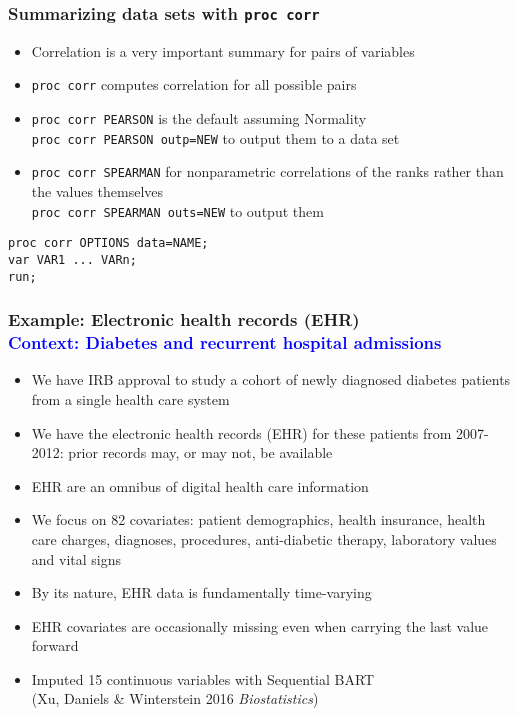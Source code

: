 \documentclass[11pt,pdftex,dvipsnames,usenames,helvetica]{beamer}
\begin{document}
\begin{frame}[fragile]
\frametitle{Summarizing data sets with {\tt proc corr}}
\begin{itemize}
\item Correlation is a very important summary for pairs of variables
\item {\tt proc corr} computes correlation for all possible pairs
\item {\tt proc corr PEARSON} is the default assuming Normality\\
{\tt proc corr PEARSON outp=NEW} to output them to a data set
\item {\tt proc corr SPEARMAN} for nonparametric correlations of the ranks
rather than the values themselves\\
{\tt proc corr SPEARMAN outs=NEW} to output them
\end{itemize}
\begin{verbatim}
proc corr OPTIONS data=NAME;
var VAR1 ... VARn;
run;
\end{verbatim}
\end{frame}

\begin{frame}[fragile]
\frametitle{Example: Electronic health records (EHR)\\
\textcolor{blue}{Context: Diabetes and recurrent hospital admissions}}

\begin{itemize}
\item We have IRB approval to study a cohort of newly diagnosed diabetes patients from a single health care system
\vspace*{0.1in}
\item We have the electronic health records (EHR) for these patients
  from 2007-2012: prior records may, or may not, be available
\vspace*{0.1in}
\item EHR are an omnibus of digital health care information
 \vspace*{0.1in}
 \item We focus on 82 covariates: patient demographics, health insurance,
 health care charges, diagnoses, procedures, anti-diabetic therapy,
 laboratory values and vital signs
\vspace*{0.1in}
\item By its nature, EHR data is fundamentally time-varying %
\vspace*{0.1in}
 \item EHR covariates are occasionally missing even when carrying the last value forward
 \vspace*{0.1in}
 \item Imputed 15 continuous variables with Sequential BART\\ %
(Xu, Daniels \& Winterstein 2016 {\it Biostatistics})
 \vspace*{0.1in}
 \end{itemize}
 \end{frame}
\end{document}

